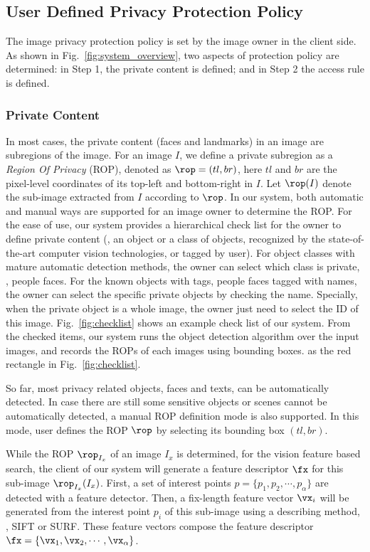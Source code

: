 {\subsection{User Defined Privacy Protection Policy}
The image privacy protection policy is set by the image owner in the client side.
As shown in Fig.~\ref{fig:system_overview},
 two aspects of protection policy are determined:
 in Step {\large{\textcircled{\small{1}}}}, the private content is defined;
 and in Step {\large{\textcircled{\small{2}}}} the access rule is defined.

\subsubsection{Private Content}
In most cases,
 the private content (\eg faces and landmarks) in an image are subregions of the image.
For an image $I$,
 we define a private subregion as a \emph{Region Of Privacy} (ROP), denoted as $\rop=(tl, br)$,
 here $tl$ and $br$  are the pixel-level coordinates of its top-left and bottom-right in $I$.
Let $\rop(I)$ denote the sub-image extracted from $I$ according to $\rop$.
In our system,
 both automatic and manual ways are supported for an image owner to
 determine the ROP.
For the ease of use,
 our system provides a hierarchical check list for the owner to define
 private content (\eg, an object or a class of objects, recognized by
 the state-of-the-art computer vision technologies, or tagged by user).
For object classes with mature automatic detection methods,
 the owner can select which class is private, \eg, people faces.
For the known objects with tags, \eg people faces tagged with names,
  the owner can select the specific private objects by checking the name.
Specially, when the private object is a whole image,
 the owner just need to select the ID of this image.
Fig.~\ref{fig:checklist} shows an example check list of our system.
From the checked items,
 our system runs the object detection algorithm over the input images,
 and records the ROPs of each images using  bounding boxes.
as the red rectangle in Fig.~\ref{fig:checklist}.

So far, most privacy related objects,
 \eg faces and texts, can be automatically detected.
In case  there are still some sensitive objects or scenes
 cannot be automatically detected,
 a manual ROP definition mode is also supported.
In this mode,
 user defines the ROP $\rop$ by selecting its bounding box $(tl, br)$.

While the ROP $\rop_{I_x}$ of an image $I_x$ is determined,
 for the vision feature based search,
 the client of our system will generate a feature descriptor $\fx$ for
 this sub-image $\rop_{I_x}(I_x)$.
First, a set of interest points $p=\{p_1, p_2, \cdots, p_\alpha\}$
 are detected with a feature detector.
Then, a fix-length feature vector $\vx_i$ will be generated from
 the interest point $p_i$ of this sub-image using a describing method, \eg, SIFT \cite{lowe2004distinctive} or SURF.
These feature vectors compose the feature descriptor $\fx=\{\vx_1, \vx_2, \cdots, \vx_\alpha\}$.




}
